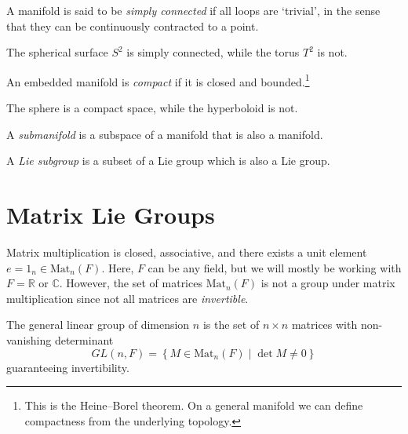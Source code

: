 \begin{definition}
  A manifold is said to be \emph{simply connected} if all loops are `trivial', in the sense that they can be continuously contracted to a point.
\end{definition}


\begin{example}[]
The spherical surface $S^2$ is simply connected, while the torus $T^2$ is not.
\end{example}

\begin{definition}[compact]
  An embedded manifold is \emph{compact} if it is closed and bounded.\footnote{This is the Heine--Borel theorem. On a general manifold we can define compactness from the underlying topology.}
\end{definition}


\begin{example}[]
The sphere is a compact space, while the hyperboloid is not.
\end{example}

\begin{definition}[submanifold]
  A \emph{submanifold} is a subspace of a manifold that is also a manifold.
\end{definition}

\begin{definition}
  A \emph{Lie subgroup} is a subset of a Lie group which is also a Lie group.
\end{definition}


\section{Matrix Lie Groups}%
\label{sec:matrix_lie_groups}

Matrix multiplication is closed, associative, and there exists a unit element $ e = 1_n \in \text{Mat}_n(F)$.  Here, $F$ can be any field, but we will mostly be working with $F = \mathbb{R}$ or $\mathbb{C}$.
However, the set of matrices $\text{Mat}_n(F)$ is not a group under matrix multiplication since not all matrices are \emph{invertible}.

\begin{definition}
The general linear group of dimension $n$ is the set of $n \times n$ matrices with non-vanishing determinant
\begin{equation}
  GL(n, F) = \left\{ M \in \text{Mat}_n(F) \mid \det M \neq 0 \right\}
\end{equation}
guaranteeing invertibility.
\end{definition}

